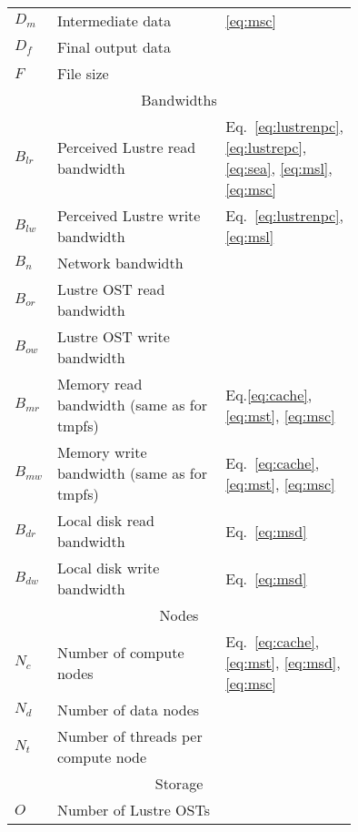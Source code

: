\begin{table}
\begin{tabular}{|p{0.05\linewidth}|p{0.6\linewidth}|p{0.1\linewidth}|}
       $D_{m}$ & Intermediate data & \ref{eq:msc} \\
       $D_{f}$ & Final output data & \\
       $F$ & File size & \\
       \hline
              \multicolumn{3}{|c|}{Bandwidths} \\                                         
       \hline                                                                      
       $B_{lr}$ & Perceived Lustre read bandwidth & Eq.~\ref{eq:lustrenpc}, \ref{eq:lustrepc}, \ref{eq:sea}, \ref{eq:msl}, \ref{eq:msc}\\
       $B_{lw}$ & Perceived Lustre write bandwidth & Eq.~\ref{eq:lustrenpc}, \ref{eq:msl}\\
       $B_{n}$ & Network bandwidth & \\              
       $B_{or}$ & Lustre OST read bandwidth & \\     
       $B_{ow}$ & Lustre OST write bandwidth & \\    
       $B_{mr}$ & Memory read bandwidth (same as for tmpfs) & Eq.\ref{eq:cache}, \ref{eq:mst}, \ref{eq:msc}\\
       $B_{mw}$ & Memory write bandwidth (same as for tmpfs) & Eq.~\ref{eq:cache}, \ref{eq:mst}, \ref{eq:msc}\\
       $B_{dr}$ & Local disk read bandwidth & Eq.~\ref{eq:msd}\\                   
       $B_{dw}$ & Local disk write bandwidth & Eq.~\ref{eq:msd}\\                  
       \hline                                                                      
       \multicolumn{3}{|c|}{Nodes} \\                                              
       \hline                                                                      
       $N_{c}$ & Number of compute nodes & Eq.~\ref{eq:cache}, \ref{eq:mst}, \ref{eq:msd}, \ref{eq:msc}\\
       $N_{d}$ & Number of data nodes & \\           
       $N_{t}$ & Number of threads per compute node & \\
       \hline                                                                      
       \multicolumn{3}{|c|}{Storage} \\                                            
       \hline                                                                      
       $O$ & Number of Lustre OSTs & \\              

\end{tabular}
\end{table}
